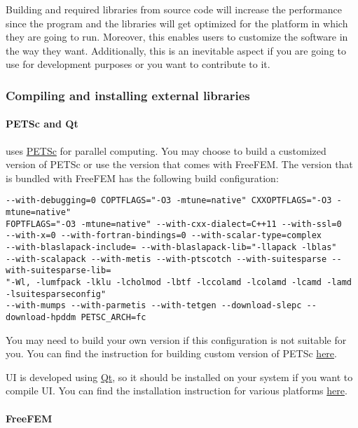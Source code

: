 Building \biodeg{} and required libraries from source code will increase the performance since the program and the libraries will get optimized for the platform in which they are going to run. Moreover, this enables users to customize the software in the way they want. Additionally, this is an inevitable aspect if you are going to use \biodeg{} for development purposes or you want to contribute to it.

\subsubsection{Compiling and installing external libraries}

\paragraph{PETSc and Qt}

\biodeg{} uses \href{https://petsc.org/release/}{PETSc} for parallel computing. You may choose to build a customized version of PETSc or use the version that comes with FreeFEM. The version that is bundled with FreeFEM has the following build configuration:

\begin{verbatim}
--with-debugging=0 COPTFLAGS="-O3 -mtune=native" CXXOPTFLAGS="-O3 -mtune=native" 
FOPTFLAGS="-O3 -mtune=native" --with-cxx-dialect=C++11 --with-ssl=0 
--with-x=0 --with-fortran-bindings=0 --with-scalar-type=complex
--with-blaslapack-include= --with-blaslapack-lib="-llapack -lblas"
--with-scalapack --with-metis --with-ptscotch --with-suitesparse --with-suitesparse-lib=
"-Wl, -lumfpack -lklu -lcholmod -lbtf -lccolamd -lcolamd -lcamd -lamd -lsuitesparseconfig"
--with-mumps --with-parmetis --with-tetgen --download-slepc --download-hpddm PETSC_ARCH=fc
\end{verbatim}

You may need to build your own version if this configuration is not suitable for you. You can find the instruction for building custom version of PETSc \href{https://petsc.org/release/install/}{here}.

\biodeg{} UI is developed using \href{https://www.qt.io/}{Qt}, so it should be installed on your system if you want to compile \biodeg{} UI. You can find the installation instruction for various platforms \href{https://doc.qt.io/qt-5/gettingstarted.html}{here}.

\paragraph{FreeFEM}

